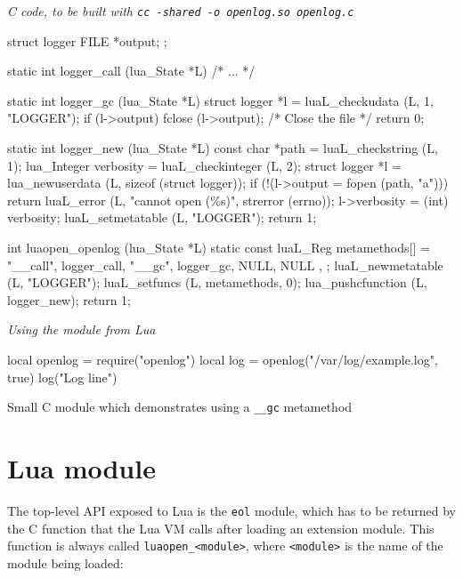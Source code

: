 \begin{listing}[tH]
  \small
  \begin{center}
    \emph{C code, to be built with \texttt{cc -shared -o openlog.so
    openlog.c}}
  \end{center}
\begin{ccode}
struct logger {
  FILE *output;
};

static int logger_call (lua_State *L) { /* ... */ }

static int logger_gc (lua_State *L) {
  struct logger *l = luaL_checkudata (L, 1, "LOGGER");
  if (l->output) fclose (l->output); /* Close the file */
  return 0;
}

static int logger_new (lua_State *L) {
  const char *path = luaL_checkstring (L, 1);
  lua_Integer verbosity = luaL_checkinteger (L, 2);
  struct logger *l = lua_newuserdata (L, sizeof (struct logger));
  if (!(l->output = fopen (path, "a")))
    return luaL_error (L, "cannot open (\%s)", strerror (errno));
  l->verbosity = (int) verbosity;
  luaL_setmetatable (L, "LOGGER");
  return 1;
}

int luaopen_openlog (lua_State *L) {
  static const luaL_Reg metamethods[] = {
    { "__call", logger_call, }
    { "__gc", logger_gc, }
    { NULL, NULL },
  };
  luaL_newmetatable (L, "LOGGER");
  luaL_setfuncs (L, metamethods, 0);
  lua_pushcfunction (L, logger_new);
  return 1;
}
\end{ccode}

  \begin{center}
    \emph{Using the module from Lua}
  \end{center}

\begin{luacode}
  local openlog = require("openlog")
  local log = openlog("/var/log/example.log", true)
  log("Log line")
\end{luacode}

  \caption{Small C module which demonstrates using a \texttt{\_\_gc} metamethod}
  \label{lst:lua-gc-example-module}
\end{listing}


\section{\Eol* Lua module}

The top-level API exposed to Lua is the \verb|eol| module, which has to be
returned by the C function that the Lua VM calls after loading an extension
module. This function is always called \verb|luaopen_<module>|, where
\verb|<module>| is the name of the module being loaded:

